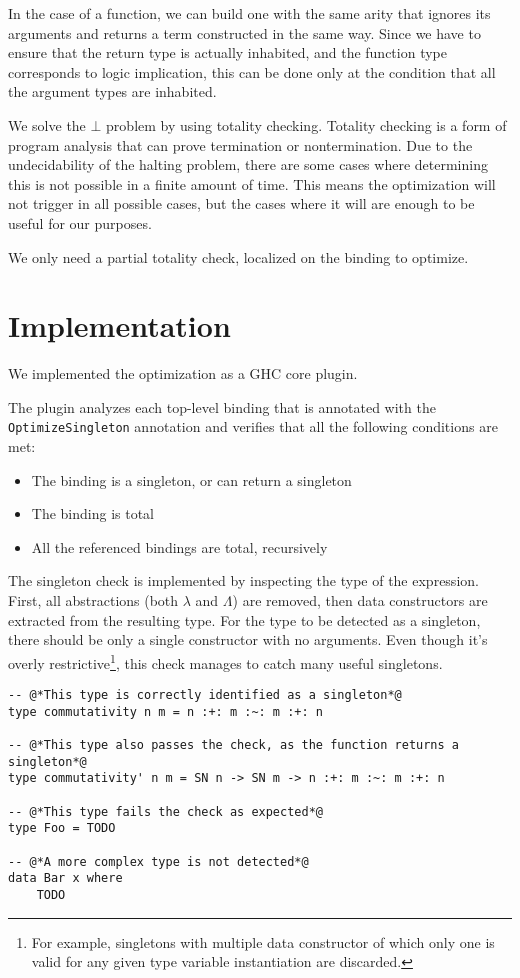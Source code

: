 In the case of a function, we can build one with the same arity that ignores its arguments and returns a term constructed in the same way.
Since we have to ensure that the return type is actually inhabited, and the function type corresponds to logic implication, this can be done only at the condition that all the argument types are inhabited.

We solve the $\bot$ problem by using totality checking.
Totality checking is a form of program analysis that can prove termination or nontermination.
Due to the undecidability of the halting problem, there are some cases where determining this is not possible in a finite amount of time.
This means the optimization will not trigger in all possible cases, but the cases where it will are enough to be useful for our purposes.

We only need a partial totality check, localized on the binding to optimize.

\section{Implementation}
\label{sec:implementation}

We implemented the optimization as a GHC core plugin.

The plugin analyzes each top-level binding that is annotated with the \texttt{OptimizeSingleton} annotation and verifies that all the following conditions are met:

\begin{itemize}
  \item{The binding is a singleton, or can return a singleton}
  \item{The binding is total}
  \item{All the referenced bindings are total, recursively}
\end{itemize}

The singleton check is implemented by inspecting the type of the expression.
First, all abstractions (both $\lambda$ and $\Lambda$) are removed, then data constructors are extracted from the resulting type.
For the type to be detected as a singleton, there should be only a single constructor with no arguments.
Even though it's overly restrictive\footnote{For example, singletons with multiple data constructor of which only one is valid for any given type variable instantiation are discarded.}, this check manages to catch many useful singletons.

\begin{lstlisting}[caption=Some examples of singleton detection]
-- @*This type is correctly identified as a singleton*@
type commutativity n m = n :+: m :~: m :+: n

-- @*This type also passes the check, as the function returns a singleton*@
type commutativity' n m = SN n -> SN m -> n :+: m :~: m :+: n

-- @*This type fails the check as expected*@
type Foo = TODO

-- @*A more complex type is not detected*@
data Bar x where
    TODO
\end{lstlisting}

